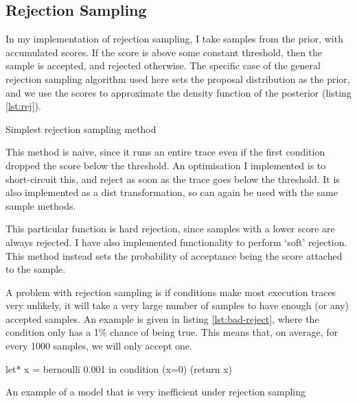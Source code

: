 \subsection{Rejection Sampling} \label{sec:rej}
In my implementation of rejection sampling, I take samples from the prior, with accumulated scores. If the score is above some constant threshold, then the sample is accepted, and rejected otherwise. The specific case of the general rejection sampling algorithm used here sets the proposal distribution as the prior, and we use the scores to approximate the density function of the posterior (listing \ref{lst:rej}).
				
\begin{listing}[!htb]
	\centering
	\caption{Simplest rejection sampling method}
	\label{lst:rej}
\end{listing}
				
This method is naive, since it runs an entire trace even if the first condition dropped the score below the threshold. An optimisation I implemented is to short-circuit this, and reject as soon as the trace goes below the threshold. It is also implemented as a dist transformation, so can again be used with the same sample methods.
				
This particular function is hard rejection, since samples with a lower score are always rejected. I have also implemented functionality to perform `soft' rejection. This method instead sets the probability of acceptance being the score attached to the sample.
				
A problem with rejection sampling is if conditions make most execution traces very unlikely, it will take a very large number of samples to have enough (or any) accepted samples. An example is given in listing \ref{lst:bad-reject}, where the condition only has a 1\% chance of being true. This means that, on average, for every 1000 samples, we will only accept one.
				
\begin{listing}[!htb]
	\centering
	\begin{ocamlcode-in}
		let* x = bernoulli 0.001 in
		condition (x=0)
		(return x)
	\end{ocamlcode-in}
			
	\caption{An example of a model that is very inefficient under rejection sampling}
	\label{lst:bad-reject}
\end{listing}
% 
